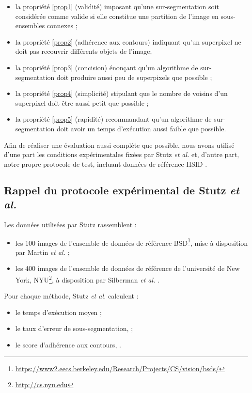 \begin{itemize}
\item la propriété \ref{prop1} (validité) imposant qu'une sur-segmentation soit considérée comme valide si elle constitue une partition de l'image en sous-ensembles connexes ;
\item la propriété \ref{prop2} (adhérence aux contours) indiquant qu'un superpixel ne doit pas recouvrir différents objets de l'image;
\item la propriété \ref{prop3} (concision) énonçant qu'un algorithme de sur-segmentation doit produire aussi peu de superpixels que possible ;
\item la propriété \ref{prop4} (simplicité) stipulant que le nombre de voisins d'un superpixel doit être aussi petit que possible ;
\item la propriété \ref{prop5} (rapidité) recommandant qu'un algorithme de sur-segmentation doit avoir un temps d'exécution aussi faible que possible.
\end{itemize}

Afin de réaliser une évaluation aussi complète que possible, nous avons utilisé d'une part les conditions expérimentales fixées par Stutz \textit{et al.} \cite{stutz2015superpixel} et, d'autre part, notre propre protocole de test, incluant  données de référence HSID \cite{mathieu2017hsid}.

\subsection{Rappel du protocole expérimental de Stutz \textit{et al.}}

Les données utilisées par Stutz  rassemblent :
\begin{itemize}
\item les 100 images de l'ensemble de données de référence BSD\footnote{\url{https://www2.eecs.berkeley.edu/Research/Projects/CS/vision/bsds/}}, mise à disposition par Martin \textit{et al.} \cite{MartinFTM01} ;
\item les 400 images de l'ensemble de données de référence de l'université de New York, NYU\footnote{\url{http://cs.nyu.edu}},  à disposition par Silberman \textit{et al.} \cite{silberman2012indoor}.
\end{itemize}

Pour chaque méthode, Stutz \textit{et al.} calculent :
\begin{itemize}
\item le temps d'exécution moyen ;
\item le taux d'erreur de sous-segmentation,  ;
\item le score d'adhérence aux contours, .
\end{itemize}



